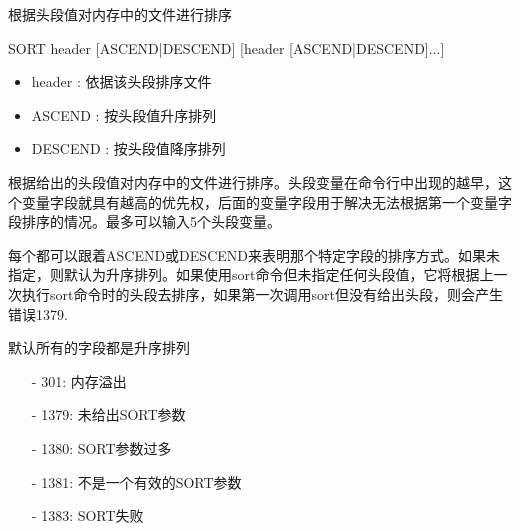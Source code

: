 \label{cmd:sort}

根据头段值对内存中的文件进行排序

\begin{SACSTX}
SORT header [ASCEND|DESCEND] [header [ASCEND|DESCEND]...]
\end{SACSTX}

\begin{itemize}
\item header : 依据该头段排序文件 
\item ASCEND : 按头段值升序排列 
\item DESCEND : 按头段值降序排列 
\end{itemize}

根据给出的头段值对内存中的文件进行排序。头段变量在命令行中出现的越早，这个变量字段就具有越高的优先权，后面的变量字段用于解决无法根据第一个变量字段排序的情况。最多可以输入5个头段变量。

每个都可以跟着ASCEND或DESCEND来表明那个特定字段的排序方式。如果未指定，则默认为升序排列。如果使用sort命令但未指定任何头段值，它将根据上一次执行sort命令时的头段去排序，如果第一次调用sort但没有给出头段，则会产生错误1379.

默认所有的字段都是升序排列

\begin{itemize}
\item[-]301:  内存溢出
\item[-]1379: 未给出SORT参数
\item[-]1380: SORT参数过多
\item[-]1381: 不是一个有效的SORT参数
\item[-]1383: SORT失败
\end{itemize}
